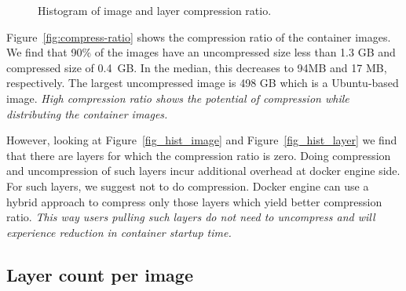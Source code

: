 \begin{figure}[!t]
	\centering
	\caption{Histogram of image and layer compression ratio.}
	\label{fig:reference-cnt}
\end{figure}

Figure~\ref{fig:compress-ratio} shows the compression ratio of the container
images.  We find that 90\% of the images have an uncompressed size less than
1.3 GB and compressed size of 0.4~GB.
In the median, this decreases to 94MB and 17 MB, respectively.  The largest
uncompressed image is 498 GB which is a Ubuntu-based image.  \emph{High compression
ratio shows the potential of compression while distributing the container
images.  }

However, looking at Figure~\ref{fig_hist_image} and Figure~\ref{fig_hist_layer}
we find that there are layers for which the compression ratio is zero. Doing
compression and uncompression of such layers incur additional overhead at
docker engine side.  For such layers, we suggest not to do compression.
Docker engine can use a hybrid approach to compress
only those layers which yield better compression ratio. 
\emph{This way users pulling such layers do not need to uncompress
and will experience reduction in container startup time.}

\subsection{Layer count per image}

